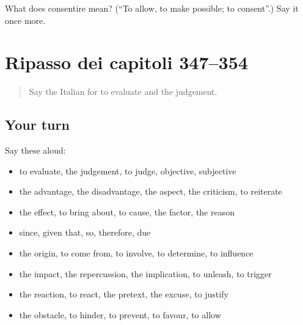 \begin{tcolorbox}[breakable,colback=teal!4,colframe=teal!35!black,title={Before you move on}]
What does consentire mean? (\textquotedblleft{}To allow, to make possible; to consent\textquotedblright{}.) Say it once more.
\end{tcolorbox}
\section[(dialogue)]{Ripasso dei capitoli 347–354}

\label{lesson:IT-R354-ripasso-347-354}



\begin{quote}
Say the Italian for to evaluate and the judgement.
\end{quote}

\subsection*{Your turn}
Say these aloud:

\begin{itemize}
\raggedright
  \item to evaluate, the judgement, to judge, objective, subjective
  \item the advantage, the disadvantage, the aspect, the criticism, to reiterate
  \item the effect, to bring about, to cause, the factor, the reason
  \item since, given that, so, therefore, due
  \item the origin, to come from, to involve, to determine, to influence
  \item the impact, the repercussion, the implication, to unleash, to trigger
  \item the reaction, to react, the pretext, the excuse, to justify
  \item the obstacle, to hinder, to prevent, to favour, to allow
\end{itemize}


